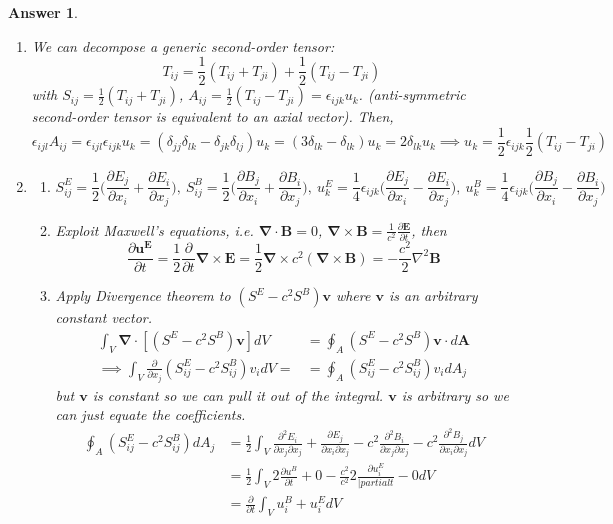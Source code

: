 \documentclass[a4paper]{article}
\newtheorem{ans}{Answer}[section]
\theoremstyle{new}
\begin{document}
\begin{ans}\leavevmode
\begin{enumerate}[label=(\alph*)]
\item We can decompose a generic second-order tensor:
$$T_{ij}=\frac{1}{2}(T_{ij}+T_{ji})+\frac{1}{2}(T_{ij}-T_{ji})$$
with $S_{ij}=\frac{1}{2}(T_{ij}+T_{ji})$, $A_{ij}=\frac{1}{2}(T_{ij}-T_{ji})=\epsilon_{ijk}u_k$. (anti-symmetric second-order tensor is equivalent to an axial vector). Then,
$$\epsilon_{ijl}A_{ij}=\epsilon_{ijl}\epsilon_{ijk}u_k=(\delta_{jj}\delta_{lk}-\delta_{jk}\delta_{lj})u_k=(3\delta_{lk}-\delta_{lk})u_k=2\delta_{lk}u_k\implies u_k=\frac{1}{2}\epsilon_{ijk}\frac{1}{2}(T_{ij}-T_{ji})$$
\item
\begin{enumerate}[label=(\roman*)]
\item $$S_{ij}^{E}=\frac{1}{2}\bigg(\frac{\partial E_j}{\partial x_i}+\frac{\partial E_i}{\partial x_j}\bigg),~S_{ij}^{B}=\frac{1}{2}\bigg(\frac{\partial B_j}{\partial x_i}+\frac{\partial B_i}{\partial x_j}\bigg),~ u^E_k=\frac{1}{4}\epsilon_{ijk}\bigg(\frac{\partial E_j}{\partial x_i}-\frac{\partial E_i}{\partial x_j}\bigg),~u^B_k=\frac{1}{4}\epsilon_{ijk}\bigg(\frac{\partial B_j}{\partial x_i}-\frac{\partial B_i}{\partial x_j}\bigg)$$
\item Exploit Maxwell's equations, i.e. $\boldsymbol{\nabla}\cdot\mathbf{B}=0$, $\boldsymbol{\nabla}\times\mathbf{B}=\frac{1}{c^2}\frac{\partial\mathbf{E}}{\partial t}$, then
$$\frac{\partial\mathbf{u^E}}{\partial t}=\frac{1}{2}\frac{\partial}{\partial t}\boldsymbol{\nabla}\times\mathbf{E}=\frac{1}{2}\boldsymbol{\nabla}\times c^2(\boldsymbol{\nabla}\times\mathbf{B})=-\frac{c^2}{2}\nabla^2\mathbf{B}$$
\item Apply Divergence theorem to $(S^E-c^2S^B)\mathbf{v}$ where $\mathbf{v}$ is an arbitrary constant vector.
\begin{align}
    \int_V\boldsymbol{\nabla}\cdot[(S^E-c^2S^B)\mathbf{v}]dV&=\oint_A(S^E-c^2S^B)\mathbf{v}\cdot d\mathbf{A}\nonumber\\\implies\int_V\frac{\partial}{\partial x_j}(S_{ij}^E-c^2S_{ij}^B)v_idV=&=\oint_A(S_{ij}^E-c^2S_{ij}^B)v_idA_j\nonumber
\end{align}
but $\mathbf{v}$ is constant so we can pull it out of the integral. $\mathbf{v}$ is arbitrary so we can just equate the coefficients. 
\begin{align}
    \oint_A(S_{ij}^E-c^2S_{ij}^B)dA_j&=\frac{1}{2}\int_V\frac{\partial^2E_i}{\partial x_j\partial x_j}+\frac{\partial E_j}{\partial x_i\partial x_j}-c^2\frac{\partial^2B_i}{\partial x_j\partial x_j}-c^2\frac{\partial^2B_j}{\partial x_i\partial x_j}dV\nonumber\\&=\frac{1}{2}\int_V2\frac{\partial u^B}{\partial t}+0-\frac{c^2}{c^2}2\frac{\partial u_i^E}{|partial t}-0dV\nonumber\\&=\frac{\partial}{\partial t}\int_Vu_i^B+u_i^EdV\nonumber

\end{align}
\end{enumerate}
\end{enumerate}
\end{ans}
\end{document}

